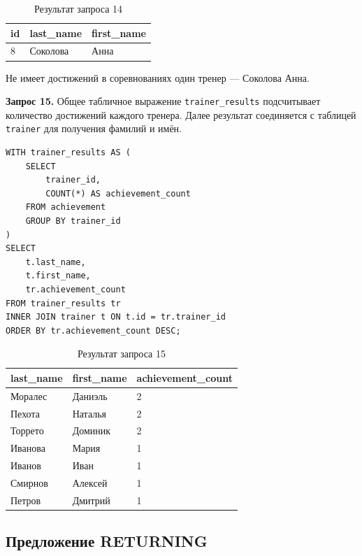 \documentclass[oneside,a4paper,14pt]{extarticle}
\begin{document}
\begin{table}[H]
\centering
\footnotesize

\caption{Результат запроса 14}\label{tab:cte2}
\begin{tabular}{|l|l|l|}
\hline
\textbf{id} & \textbf{last\_\allowbreak name} & \textbf{first\_\allowbreak name} \\ \hline
8 & Соколова & Анна \\ \hline
\end{tabular}
\end{table}

Не имеет достижений в соревнованиях один тренер --- Соколова Анна.


\textbf{Запрос 15.} Общее табличное выражение \texttt{trainer\_results} подсчитывает количество достижений каждого тренера. Далее результат соединяется с таблицей \texttt{trainer} для получения фамилий и имён.

\begin{verbatim}
WITH trainer_results AS (
    SELECT
        trainer_id,
        COUNT(*) AS achievement_count
    FROM achievement
    GROUP BY trainer_id
)
SELECT
    t.last_name,
    t.first_name,
    tr.achievement_count
FROM trainer_results tr
INNER JOIN trainer t ON t.id = tr.trainer_id
ORDER BY tr.achievement_count DESC;
\end{verbatim}

\begin{table}[H]
\centering
\footnotesize

\caption{Результат запроса 15}\label{tab:cte3}
\begin{tabular}{|l|l|l|}
\hline
\textbf{last\_\allowbreak name} & \textbf{first\_\allowbreak name} & \textbf{achievement\_\allowbreak count} \\ \hline
Моралес & Даниэль & 2 \\ \hline
Пехота & Наталья & 2 \\ \hline
Торрето & Доминик & 2 \\ \hline
Иванова & Мария & 1 \\ \hline
Иванов & Иван & 1 \\ \hline
Смирнов & Алексей & 1 \\ \hline
Петров & Дмитрий & 1 \\ \hline
\end{tabular}
\end{table}


\subsection{Предложение RETURNING}
\end{document}
